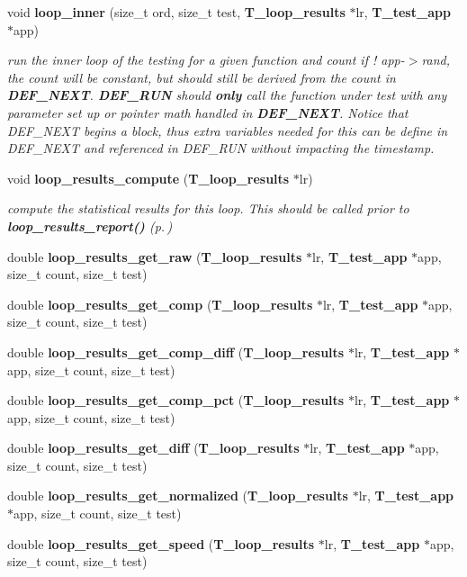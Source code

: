 \begin{CompactItemize}
void {\bf loop\_\-inner} (size\_\-t ord, size\_\-t test, {\bf T\_\-loop\_\-results} $\ast$lr, {\bf T\_\-test\_\-app} $\ast$app)
\begin{CompactList}\small\item\em run the inner loop of the testing for a given function and count if ! app-$>$rand, the count will be constant, but should still be derived from the count in {\bf DEF\_\-NEXT}. {\bf DEF\_\-RUN} should {\bf only} call the function under test with any parameter set up or pointer math handled in {\bf DEF\_\-NEXT}. Notice that DEF\_\-NEXT begins a block, thus extra variables needed for this can be define in DEF\_\-NEXT and referenced in DEF\_\-RUN without impacting the timestamp.\item\end{CompactList}\item 
void {\bf loop\_\-results\_\-compute} ({\bf T\_\-loop\_\-results} $\ast$lr)
\begin{CompactList}\small\item\em compute the statistical results for this loop. This should be called prior to {\bf loop\_\-results\_\-report()} {\rm (p.\,\pageref{group__loop__test_a19})}\item\end{CompactList}\item 
double {\bf loop\_\-results\_\-get\_\-raw} ({\bf T\_\-loop\_\-results} $\ast$lr, {\bf T\_\-test\_\-app} $\ast$app, size\_\-t count, size\_\-t test)
\item 
double {\bf loop\_\-results\_\-get\_\-comp} ({\bf T\_\-loop\_\-results} $\ast$lr, {\bf T\_\-test\_\-app} $\ast$app, size\_\-t count, size\_\-t test)
\item 
double {\bf loop\_\-results\_\-get\_\-comp\_\-diff} ({\bf T\_\-loop\_\-results} $\ast$lr, {\bf T\_\-test\_\-app} $\ast$app, size\_\-t count, size\_\-t test)
\item 
double {\bf loop\_\-results\_\-get\_\-comp\_\-pct} ({\bf T\_\-loop\_\-results} $\ast$lr, {\bf T\_\-test\_\-app} $\ast$app, size\_\-t count, size\_\-t test)
\item 
double {\bf loop\_\-results\_\-get\_\-diff} ({\bf T\_\-loop\_\-results} $\ast$lr, {\bf T\_\-test\_\-app} $\ast$app, size\_\-t count, size\_\-t test)
\item 
double {\bf loop\_\-results\_\-get\_\-normalized} ({\bf T\_\-loop\_\-results} $\ast$lr, {\bf T\_\-test\_\-app} $\ast$app, size\_\-t count, size\_\-t test)
\item 
double {\bf loop\_\-results\_\-get\_\-speed} ({\bf T\_\-loop\_\-results} $\ast$lr, {\bf T\_\-test\_\-app} $\ast$app, size\_\-t count, size\_\-t test)

\end{CompactItemize}
